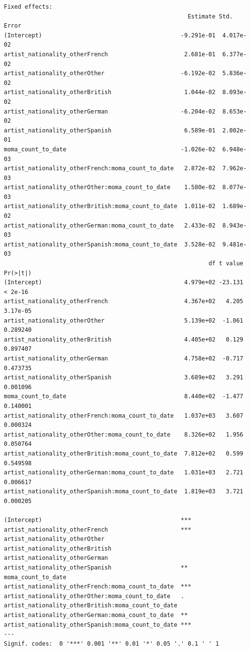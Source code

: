 \documentclass[
  letterpaper,
  DIV=11,
  numbers=noendperiod]{scrreprt}
\begin{document}
\begin{verbatim}
Fixed effects:
                                                     Estimate Std. Error
(Intercept)                                        -9.291e-01  4.017e-02
artist_nationality_otherFrench                      2.681e-01  6.377e-02
artist_nationality_otherOther                      -6.192e-02  5.836e-02
artist_nationality_otherBritish                     1.044e-02  8.093e-02
artist_nationality_otherGerman                     -6.204e-02  8.653e-02
artist_nationality_otherSpanish                     6.589e-01  2.002e-01
moma_count_to_date                                 -1.026e-02  6.948e-03
artist_nationality_otherFrench:moma_count_to_date   2.872e-02  7.962e-03
artist_nationality_otherOther:moma_count_to_date    1.580e-02  8.077e-03
artist_nationality_otherBritish:moma_count_to_date  1.011e-02  1.689e-02
artist_nationality_otherGerman:moma_count_to_date   2.433e-02  8.943e-03
artist_nationality_otherSpanish:moma_count_to_date  3.528e-02  9.481e-03
                                                           df t value Pr(>|t|)
(Intercept)                                         4.979e+02 -23.131  < 2e-16
artist_nationality_otherFrench                      4.367e+02   4.205 3.17e-05
artist_nationality_otherOther                       5.139e+02  -1.061 0.289240
artist_nationality_otherBritish                     4.405e+02   0.129 0.897407
artist_nationality_otherGerman                      4.758e+02  -0.717 0.473735
artist_nationality_otherSpanish                     3.689e+02   3.291 0.001096
moma_count_to_date                                  8.440e+02  -1.477 0.140001
artist_nationality_otherFrench:moma_count_to_date   1.037e+03   3.607 0.000324
artist_nationality_otherOther:moma_count_to_date    8.326e+02   1.956 0.050764
artist_nationality_otherBritish:moma_count_to_date  7.812e+02   0.599 0.549598
artist_nationality_otherGerman:moma_count_to_date   1.031e+03   2.721 0.006617
artist_nationality_otherSpanish:moma_count_to_date  1.819e+03   3.721 0.000205
                                                      
(Intercept)                                        ***
artist_nationality_otherFrench                     ***
artist_nationality_otherOther                         
artist_nationality_otherBritish                       
artist_nationality_otherGerman                        
artist_nationality_otherSpanish                    ** 
moma_count_to_date                                    
artist_nationality_otherFrench:moma_count_to_date  ***
artist_nationality_otherOther:moma_count_to_date   .  
artist_nationality_otherBritish:moma_count_to_date    
artist_nationality_otherGerman:moma_count_to_date  ** 
artist_nationality_otherSpanish:moma_count_to_date ***
---
Signif. codes:  0 '***' 0.001 '**' 0.01 '*' 0.05 '.' 0.1 ' ' 1


\end{verbatim}
\end{document}
